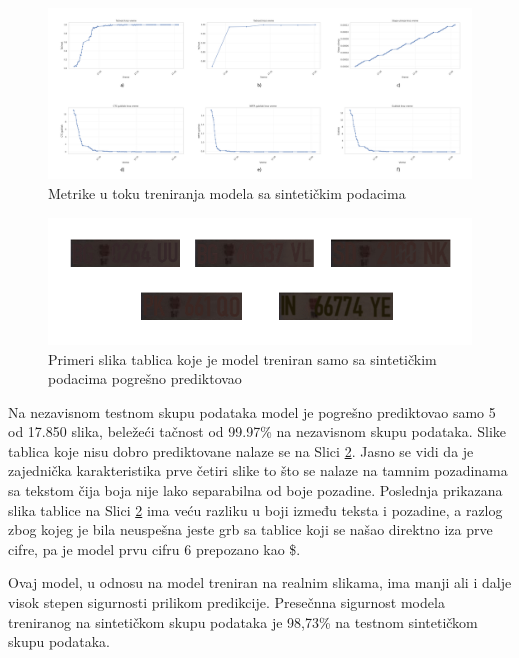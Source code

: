 \documentclass[a4paper,12pt]{article}
\begin{document}
	\begin{figure}[H]
		\centering
		\includegraphics[width=\textwidth]{assets/synthetic-data-metrics.png}
		\caption{Metrike u toku treniranja modela sa sintetičkim podacima}
		\label{fig:synthetic-data-metrics}
	\end{figure}
	
	\begin{figure}[H]
		\centering
		\includegraphics[width=\textwidth]{assets/bad-predictions-synthetic-data-model.png}
		\caption{Primeri slika tablica koje je model treniran samo sa sintetičkim podacima pogrešno prediktovao}
		\label{fig:bad-predictions-synthetic-data-model}
	\end{figure}
	
	Na nezavisnom testnom skupu podataka model je pogrešno prediktovao samo 5 od 17.850 slika, beležeći tačnost od 99.97\% na nezavisnom skupu podataka. Slike tablica koje nisu dobro prediktovane nalaze se na Slici \ref{fig:bad-predictions-synthetic-data-model}. Jasno se vidi da je zajednička karakteristika prve četiri slike to što se nalaze na tamnim pozadinama sa tekstom čija boja nije lako separabilna od boje pozadine. Poslednja prikazana slika tablice na Slici \ref{fig:bad-predictions-synthetic-data-model} ima veću razliku u boji između teksta i pozadine, a razlog zbog kojeg je bila neuspešna jeste grb sa tablice koji se našao direktno iza prve cifre, pa je model prvu cifru 6 prepozano kao \$.
	
	Ovaj model, u odnosu na model treniran na realnim slikama, ima manji ali i dalje visok stepen sigurnosti prilikom predikcije. Presečnna sigurnost modela treniranog na sintetičkom skupu podataka je 98,73\% na testnom sintetičkom skupu podataka.
	
\end{document}
